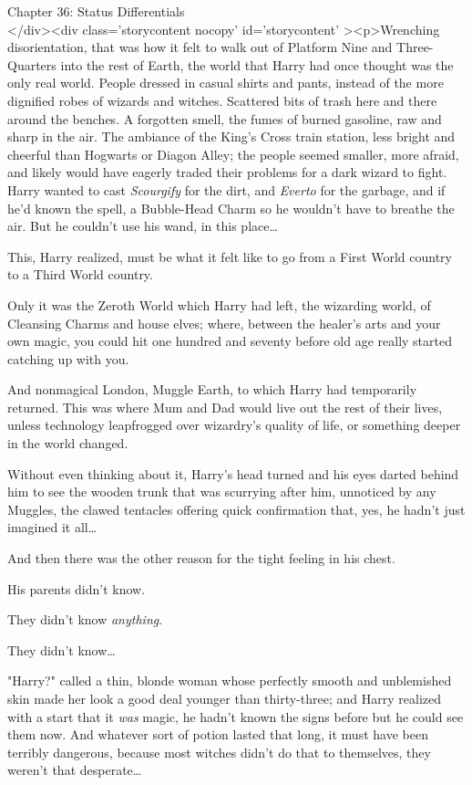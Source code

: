 
Chapter 36: Status Differentials\\
</div><div  class='storycontent nocopy' id='storycontent' ><p>Wrenching 
disorientation, that was how it felt to walk out of Platform Nine and 
Three-Quarters into the rest of Earth, the world that Harry had once thought 
was the only real world. People dressed in casual shirts and pants, instead of 
the more dignified robes of wizards and witches. Scattered bits of trash here 
and there around the benches. A forgotten smell, the fumes of burned gasoline, 
raw and sharp in the air. The ambiance of the King's Cross train station, less 
bright and cheerful than Hogwarts or Diagon Alley; the people seemed smaller, 
more afraid, and likely would have eagerly traded their problems for a dark 
wizard to fight. Harry wanted to cast \emph{Scourgify} for the dirt, and 
\emph{Everto} for the garbage, and if he'd known the spell, a Bubble-Head Charm 
so he wouldn't have to breathe the air. But he couldn't use his wand, in this 
place{\ldots}

This, Harry realized, must be what it felt like to go from a First World 
country to a Third World country.

Only it was the Zeroth World which Harry had left, the wizarding world, of 
Cleansing Charms and house elves; where, between the healer's arts and your own 
magic, you could hit one hundred and seventy before old age really started 
catching up with you.

And nonmagical London, Muggle Earth, to which Harry had temporarily returned. 
This was where Mum and Dad would live out the rest of their lives, unless 
technology leapfrogged over wizardry's quality of life, or something deeper in 
the world changed.

Without even thinking about it, Harry's head turned and his eyes darted behind 
him to see the wooden trunk that was scurrying after him, unnoticed by any 
Muggles, the clawed tentacles offering quick confirmation that, yes, he hadn't 
just imagined it all{\ldots}

And then there was the other reason for the tight feeling in his chest.

His parents didn't know.

They didn't know \emph{anything}.

They didn't know{\ldots}

"Harry?" called a thin, blonde woman whose perfectly smooth and unblemished 
skin made her look a good deal younger than thirty-three; and Harry realized 
with a start that it \emph{was} magic, he hadn't known the signs before but he 
could see them now. And whatever sort of potion lasted that long, it must have 
been terribly dangerous, because most witches didn't do that to themselves, 
they weren't that desperate{\ldots}

